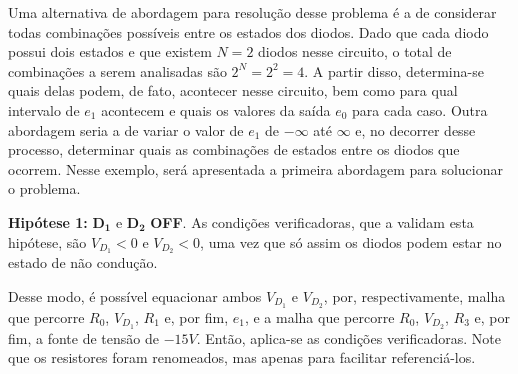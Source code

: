 \documentclass{article}
\numberwithin{equation}{section}
\newlength\Colsep
\let\dfr\dfrac
\newcommand{\itembull}[1]{\noindent\textbf{\small{\textbullet \hspace{1.5mm}#1}}}
\begin{document}
\vspace{5mm}

Uma alternativa de abordagem para resolução desse problema é a de considerar todas combinações possíveis entre os estados dos diodos. Dado que cada diodo possui dois estados e que existem $N=2$ diodos nesse circuito, o total de combinações a serem analisadas são $2^N=2^2=4$. A partir disso, determina-se quais delas podem, de fato, acontecer nesse circuito, bem como para qual intervalo de $e_1$ acontecem e quais os valores da saída $e_0$ para cada caso. Outra abordagem seria a de variar o valor de $e_1$ de $-\infty$ até $\infty$ e, no decorrer desse processo, determinar quais as combinações de estados entre os diodos que ocorrem. Nesse exemplo, será apresentada a primeira abordagem para solucionar o problema.

\vspace{5mm}

\itembull{Hipótese 1:} $\mathbf{D_1}$ e $\mathbf{D_2}$ \textbf{OFF}. As condições verificadoras, que a validam esta hipótese, são $V_{D_1}<0$ e $V_{D_2}<0$, uma vez que só assim os diodos podem estar no estado de não condução.

\noindent\begin{minipage}{0.95\textwidth}
\begin{minipage}[c][7cm][c]{\dimexpr0.6\textwidth-0.5\Colsep\relax}
    \begin{center}
    \end{center}
\end{minipage} \hfill
\begin{minipage}[c][7cm][c]{\dimexpr0.4\textwidth-0.5\Colsep\relax}
    Desse modo, é possível equacionar ambos $V_{D_1}$ e $V_{D_2}$, por, respectivamente, malha que percorre $R_0$, $V_{D_1}$, $R_1$ e, por fim, $e_1$, e a malha que percorre $R_0$, $V_{D_2}$, $R_3$ e, por fim, a fonte de tensão de $-15V$. Então, aplica-se as condições verificadoras. Note que os resistores foram renomeados, mas apenas para facilitar referenciá-los.
\end{minipage}
\end{minipage}
\end{document}
